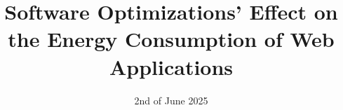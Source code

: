\documentclass[runningheads]{llncs}
\begin{document}
\title{Software Optimizations' Effect on the Energy Consumption of Web Applications}
\date{2nd of June 2025}



\maketitle
















\printbibliography

\clearpage
\end{document}
